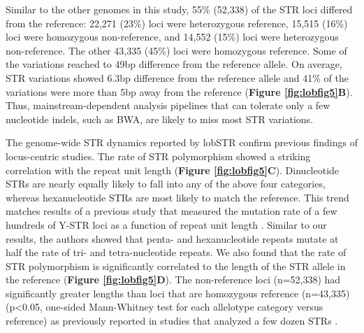 Similar to the other genomes in this study, 55\% (52,338) of the STR loci differed from the reference: 22,271 (23\%) loci were heterozygous reference, 15,515 (16\%) loci were homozygous non-reference, and 14,552 (15\%) loci were heterozygous non-reference. The other 43,335 (45\%) loci were homozygous reference. Some of the variations reached to 49bp difference from the reference allele. On average, STR variations showed 6.3bp difference from the reference allele and 41\% of the variations were more than 5bp away from the reference (\textbf{Figure \ref{fig:lobfig5}B}). Thus, mainstream-dependent analysis pipelines that can tolerate only a few nucleotide indels, such as BWA, are likely to miss most STR variations.

The genome-wide STR dynamics reported by lobSTR confirm previous findings of locus-centric studies. The rate of STR polymorphism showed a striking correlation with the repeat unit length (\textbf{Figure \ref{fig:lobfig5}C}). Dinucleotide STRs are nearly equally likely to fall into any of the above four categories, whereas hexanucleotide STRs are most likely to match the reference. This trend matches results of a previous study that measured the mutation rate of a few hundreds of Y-STR loci as a function of repeat unit length \cite{JarveZhivotovskyRootsiEtAl2009}.  Similar to our results, the authors showed that penta- and hexanucleotide repeats mutate at half the rate of tri- and tetra-nucleotide repeats. We also found that the rate of STR polymorphism is significantly correlated to the length of the STR allele in the reference (\textbf{Figure \ref{fig:lobfig5}D}). The non-reference loci (n=52,338) had significantly greater lengths than loci that are homozygous reference (n=43,335) (p<0.05, one-sided Mann-Whitney test for each allelotype category versus reference) as previously reported in studies that analyzed a few dozen STRs \cite{BrinkmannKlintscharNeuhuberEtAl1998,Ellegren2000}. 

